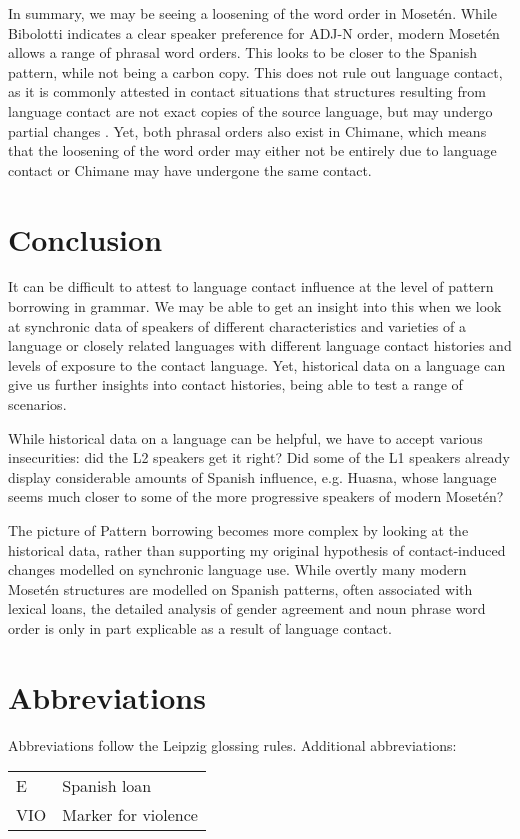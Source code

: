 \documentclass[output=paper,colorlinks,citecolor=brown
]{langscibook}
\begin{document}
In summary, we may be seeing a loosening of the word order in Mosetén. While Bibolotti indicates a clear speaker preference for ADJ-N order, modern Mosetén allows a range of phrasal word orders. This looks to be closer to the Spanish pattern, while not being a carbon copy. This does not rule out language contact, as it is commonly attested in contact situations that structures resulting from language contact are not exact copies of the source language, but may undergo partial changes \citep{heine2005language}. Yet, both phrasal orders also exist in Chimane, which means that the loosening of the word order may either not be entirely due to language contact or Chimane may have undergone the same contact.


\section{Conclusion}
It can be difficult to attest to language contact influence at the level of pattern borrowing in grammar. We may be able to get an insight into this when we look at synchronic data of speakers of different characteristics and varieties of a language or closely related languages with different language contact histories and levels of exposure to the contact language. Yet, historical data on a language can give us further insights into contact histories, being able to test a range of scenarios.

While historical data on a language can be helpful, we have to accept various insecurities: did the L2 speakers get it right? Did some of the L1 speakers already display considerable amounts of Spanish influence, e.g. Huasna, whose language seems much closer to some of the more progressive speakers of modern Mosetén?

The picture of Pattern borrowing becomes more complex by looking at the historical data, rather than supporting my original hypothesis of contact-induced changes modelled on synchronic language use. While overtly many modern Mo\-setén structures are modelled on Spanish patterns, often associated with lexical loans, the detailed analysis of gender agreement and noun phrase word order is only in part explicable as a result of language contact. 



\section*{Abbreviations}
Abbreviations follow the Leipzig glossing rules. Additional abbreviations:\medskip\\
\noindent\begin{tabularx}{.5\textwidth}{@{}lQ@{}}
E & Spanish loan\\
VIO & Marker for violence\\ 
\end{tabularx}%

\printbibliography[heading=subbibliography,notkeyword=this]
\end{document}
